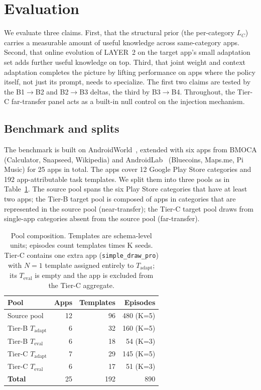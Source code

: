 \section{Evaluation}
\label{sec:eval}

We evaluate three claims. First, that the structural prior (the per-category $L_C$) carries a measurable amount of useful knowledge across same-category apps. Second, that online evolution of LAYER~2 on the target app's small adaptation set adds further useful knowledge on top. Third, that joint weight and context adaptation completes the picture by lifting performance on apps where the policy itself, not just its prompt, needs to specialize. The first two claims are tested by the B1$\to$B2 and B2$\to$B3 deltas, the third by B3$\to$B4. Throughout, the Tier-C far-transfer panel acts as a built-in null control on the injection mechanism.

\subsection{Benchmark and splits}
\label{sec:eval-benchmark}

The benchmark is built on AndroidWorld~\citep{rawles2024androidworld}, extended with six apps from BMOCA (Calculator, Snapseed, Wikipedia) and AndroidLab~\citep{xu2024androidlab} (Bluecoins, Maps.me, Pi Music) for 25 apps in total. The apps cover 12 Google Play Store categories and 192 app-attributable task templates. We split them into three pools as in Table~\ref{tab:splits}. The source pool spans the six Play Store categories that have at least two apps; the Tier-B target pool is composed of apps in categories that are represented in the source pool (near-transfer); the Tier-C target pool draws from single-app categories absent from the source pool (far-transfer).

\begin{table}[t]
\small
\centering
\begin{tabular}{lrrr}
\hline
\textbf{Pool} & \textbf{Apps} & \textbf{Templates} & \textbf{Episodes} \\
\hline
Source pool                & 12 & 96  & 480 (K=5) \\
Tier-B $T_{\text{adapt}}$  &  6 & 32  & 160 (K=5) \\
Tier-B $T_{\text{eval}}$   &  6 & 18  &  54 (K=3) \\
Tier-C $T_{\text{adapt}}$  &  7 & 29  & 145 (K=5) \\
Tier-C $T_{\text{eval}}$   &  6 & 17  &  51 (K=3) \\
\hline
\textbf{Total}             & 25 & 192 & 890 \\
\hline
\end{tabular}
\caption{Pool composition. Templates are schema-level units; episodes count templates times K seeds. Tier-C contains one extra app (\texttt{simple\_draw\_pro}) with $N{=}1$ template assigned entirely to $T_{\text{adapt}}$; its $T_{\text{eval}}$ is empty and the app is excluded from the Tier-C aggregate.}
\label{tab:splits}
\end{table}

